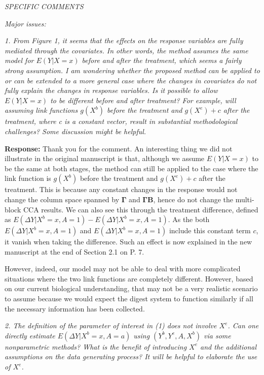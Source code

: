 \documentclass[11pt]{article}
\begin{document}
{\em SPECIFIC COMMENTS}

\medskip

{\em Major issues:}

\medskip

{\em 1. From Figure 1, it seems that the effects on the response variables are fully mediated through the covariates. In other words, the method assumes
the same model for $E(Y|X = x)$ before and after the treatment, which
seems a fairly strong assumption. I am wondering whether the proposed
method can be applied to or can be extended to a more general case where
the changes in covariates do not fully explain the changes in response
variables. Is it possible to allow $E(Y | X = x)$ to be different before and
after treatment? For example, will assuming link functions $g(X^b)$ before
the treatment and $g(X^e) + c$ after the treatment, where c is a constant
vector, result in substantial methodological challenges? Some discussion
might be helpful.}

\medskip

\textbf{Response:} Thank you for the comment. An interesting thing we did not illustrate in the original manuscript is that, although we assume $E(Y|X = x)$ to be the same at both stages, the method can still be applied to the case where the link function is $g(X^b)$ before the treatment and $g(X^e) + c$ after the treatment. This is because any constant changes in the response would not change the column space spanned by $\boldsymbol\Gamma$ and $\boldsymbol\Gamma\mathbf{B}$, hence do not change the multi-block CCA results. We can also see this through the treatment difference, defined as $E(\Delta Y | X^b = x, A = 1) - E(\Delta Y | X^b = x, A = 1)$. As the both $E(\Delta Y | X^b = x, A = 1)$ and $E(\Delta Y | X^b = x, A = 1)$ include this constant term $c$, it vanish when taking the difference. Such an effect is now explained in the new manuscript at the end of Section 2.1 on P. 7. 

However, indeed, our model may not be able to deal with more complicated situations where the two link functions are completely different. However, based on our current biological understanding, that may not be a very realistic scenario to assume because we would expect the digest system to function similarly if all the necessary information has been collected. 


\bigskip

{\em 2. The definition of the parameter of interest in (1) does not involve $X^e$. Can one directly estimate $E(\Delta Y | X^b = x,A = a)$ using $(Y^b,Y^e, A, X^b)$ via some nonparametric methods? What is the benefit of introducing $X^e$ and the additional assumptions on the data generating process? It will be helpful to elaborate the use of $X^e$.}
\end{document}
